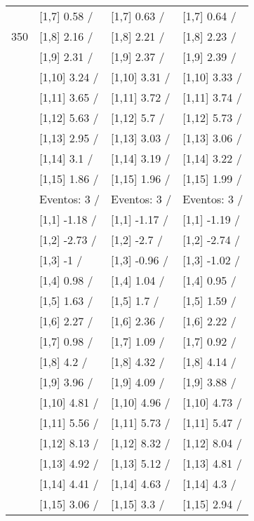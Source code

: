 \begin{table}
\begin{tabular}[t]{llll}
 & {}[1,7] 0.58  / & {}[1,7] 0.63  / & {}[1,7] 0.64  /\\
350 & {}[1,8] 2.16  / & {}[1,8] 2.21  / & {}[1,8] 2.23  /\\
\addlinespace
 & {}[1,9] 2.31  / & {}[1,9] 2.37  / & {}[1,9] 2.39  /\\
 & {}[1,10] 3.24  / & {}[1,10] 3.31  / & {}[1,10] 3.33  /\\
 & {}[1,11] 3.65  / & {}[1,11] 3.72  / & {}[1,11] 3.74  /\\
 & {}[1,12] 5.63  / & {}[1,12] 5.7  / & {}[1,12] 5.73  /\\
 & {}[1,13] 2.95  / & {}[1,13] 3.03  / & {}[1,13] 3.06  /\\
\addlinespace
 & {}[1,14] 3.1  / & {}[1,14] 3.19  / & {}[1,14] 3.22  /\\
 & {}[1,15] 1.86  / & {}[1,15] 1.96  / & {}[1,15] 1.99  /\\
 & Eventos:  3 / & Eventos:  3 / & Eventos:  3 /\\
 & {}[1,1] -1.18  / & {}[1,1] -1.17  / & {}[1,1] -1.19  /\\
 & {}[1,2] -2.73  / & {}[1,2] -2.7  / & {}[1,2] -2.74  /\\
\addlinespace
 & {}[1,3] -1  / & {}[1,3] -0.96  / & {}[1,3] -1.02  /\\
 & {}[1,4] 0.98  / & {}[1,4] 1.04  / & {}[1,4] 0.95  /\\
 & {}[1,5] 1.63  / & {}[1,5] 1.7  / & {}[1,5] 1.59  /\\
 & {}[1,6] 2.27  / & {}[1,6] 2.36  / & {}[1,6] 2.22  /\\
 & {}[1,7] 0.98  / & {}[1,7] 1.09  / & {}[1,7] 0.92  /\\
\addlinespace
500 & {}[1,8] 4.2  / & {}[1,8] 4.32  / & {}[1,8] 4.14  /\\
 & {}[1,9] 3.96  / & {}[1,9] 4.09  / & {}[1,9] 3.88  /\\
 & {}[1,10] 4.81  / & {}[1,10] 4.96  / & {}[1,10] 4.73  /\\
 & {}[1,11] 5.56  / & {}[1,11] 5.73  / & {}[1,11] 5.47  /\\
 & {}[1,12] 8.13  / & {}[1,12] 8.32  / & {}[1,12] 8.04  /\\
\addlinespace
 & {}[1,13] 4.92  / & {}[1,13] 5.12  / & {}[1,13] 4.81  /\\
 & {}[1,14] 4.41  / & {}[1,14] 4.63  / & {}[1,14] 4.3  /\\
 & {}[1,15] 3.06  / & {}[1,15] 3.3  / & {}[1,15] 2.94  /\\
\bottomrule
\end{tabular}
\end{table}
